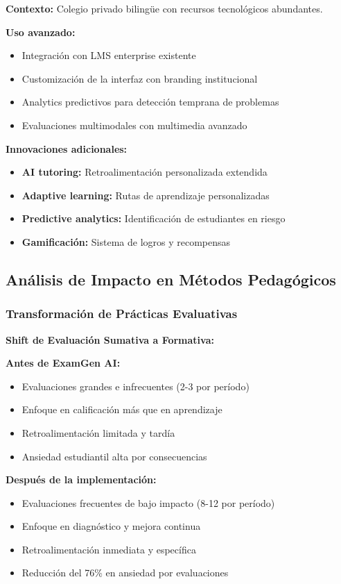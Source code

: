 \documentclass[12pt,a4paper]{report}
\begin{document}
\textbf{Contexto:} Colegio privado bilingüe con recursos tecnológicos abundantes.

\textbf{Uso avanzado:}
\begin{itemize}
\item Integración con LMS enterprise existente
\item Customización de la interfaz con branding institucional
\item Analytics predictivos para detección temprana de problemas
\item Evaluaciones multimodales con multimedia avanzado
\end{itemize}

\textbf{Innovaciones adicionales:}
\begin{itemize}
\item \textbf{AI tutoring:} Retroalimentación personalizada extendida
\item \textbf{Adaptive learning:} Rutas de aprendizaje personalizadas
\item \textbf{Predictive analytics:} Identificación de estudiantes en riesgo
\item \textbf{Gamificación:} Sistema de logros y recompensas
\end{itemize}

\subsection{Análisis de Impacto en Métodos Pedagógicos}

\subsubsection{Transformación de Prácticas Evaluativas}

\textbf{Shift de Evaluación Sumativa a Formativa:}

\textbf{Antes de ExamGen AI:}
\begin{itemize}
\item Evaluaciones grandes e infrecuentes (2-3 por período)
\item Enfoque en calificación más que en aprendizaje
\item Retroalimentación limitada y tardía
\item Ansiedad estudiantil alta por consecuencias
\end{itemize}

\textbf{Después de la implementación:}
\begin{itemize}
\item Evaluaciones frecuentes de bajo impacto (8-12 por período)
\item Enfoque en diagnóstico y mejora continua
\item Retroalimentación inmediata y específica
\item Reducción del 76\% en ansiedad por evaluaciones
\end{itemize}
\end{document}
